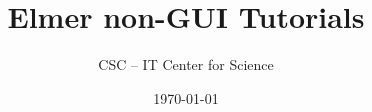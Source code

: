 \documentclass[a4paper,english]{report}    %
\title{\Huge{\bf Elmer non-GUI Tutorials}}
\author{CSC -- IT Center for Science}
\date{\today}
\begin{document}
\maketitle




\pagestyle{empty}

\setcounter{secnumdepth}{2}
\setcounter{tocdepth}{1}  %

{}
\tableofcontents


\newpage

\renewcommand{\chaptername}{Tutorial}


\pagestyle{fancy}
\rhead{\bfseries \thepage}
\lhead{\bfseries \rightmark}
\rfoot{\texttt{[image: by-nc]}}
\chead{}
\cfoot{}
\renewcommand{\headrulewidth}{0.4pt}
\renewcommand{\footrulewidth}{0.4pt}


\clearpage

 

\graphicspath{{./}{TemperatureRadiation/}}


\graphicspath{{./}{ElasticEigenValues/}}


\graphicspath{{./}{ElasticPlateLinear/}}


\graphicspath{{./}{FlowStepCompressible/}}


\graphicspath{{./}{FlowResistance/}}


\graphicspath{{./}{Electrostatics/}}

\end{document}
